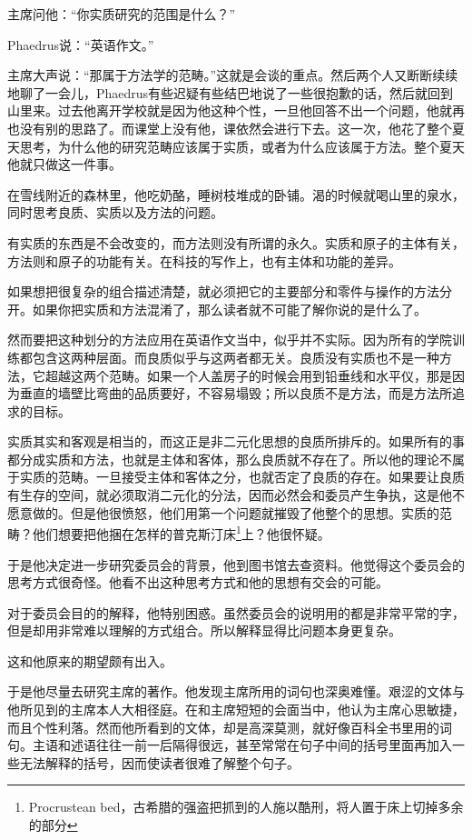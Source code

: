 \documentclass[UTF8]{article}
\begin{document}
\par 主席问他：“你实质研究的范围是什么？”
\par Phaedrus说：“英语作文。”
\par 主席大声说：“那属于方法学的范畴。”这就是会谈的重点。然后两个人又断断续续地聊了一会儿，Phaedrus有些迟疑有些结巴地说了一些很抱歉的话，然后就回到山里来。过去他离开学校就是因为他这种个性，一旦他回答不出一个问题，他就再也没有别的思路了。而课堂上没有他，课依然会进行下去。这一次，他花了整个夏天思考，为什么他的研究范畴应该属于实质，或者为什么应该属于方法。整个夏天他就只做这一件事。
\par 在雪线附近的森林里，他吃奶酪，睡树枝堆成的卧铺。渴的时候就喝山里的泉水，同时思考良质、实质以及方法的问题。
\par 有实质的东西是不会改变的，而方法则没有所谓的永久。实质和原子的主体有关，方法则和原子的功能有关。在科技的写作上，也有主体和功能的差异。
\par 如果想把很复杂的组合描述清楚，就必须把它的主要部分和零件与操作的方法分开。如果你把实质和方法混淆了，那么读者就不可能了解你说的是什么了。
\par 然而要把这种划分的方法应用在英语作文当中，似乎并不实际。因为所有的学院训练都包含这两种层面。而良质似乎与这两者都无关。良质没有实质也不是一种方法，它超越这两个范畴。如果一个人盖房子的时候会用到铅垂线和水平仪，那是因为垂直的墙壁比弯曲的品质要好，不容易塌毁；所以良质不是方法，而是方法所追求的目标。
\par 实质其实和客观是相当的，而这正是非二元化思想的良质所排斥的。如果所有的事都分成实质和方法，也就是主体和客体，那么良质就不存在了。所以他的理论不属于实质的范畴。一旦接受主体和客体之分，也就否定了良质的存在。如果要让良质有生存的空间，就必须取消二元化的分法，因而必然会和委员产生争执，这是他不愿意做的。但是他很愤怒，他们用第一个问题就摧毁了他整个的思想。实质的范畴？他们想要把他捆在怎样的普克斯汀床\footnote{Procrustean bed，古希腊的强盗把抓到的人施以酷刑，将人置于床上切掉多余的部分}上？他很怀疑。
\par 于是他决定进一步研究委员会的背景，他到图书馆去查资料。他觉得这个委员会的思考方式很奇怪。他看不出这种思考方式和他的思想有交会的可能。
\par 对于委员会目的的解释，他特别困惑。虽然委员会的说明用的都是非常平常的字，但是却用非常难以理解的方式组合。所以解释显得比问题本身更复杂。
\par 这和他原来的期望颇有出入。
\par 于是他尽量去研究主席的著作。他发现主席所用的词句也深奥难懂。艰涩的文体与他所见到的主席本人大相径庭。在和主席短短的会面当中，他认为主席心思敏捷，而且个性利落。然而他所看到的文体，却是高深莫测，就好像百科全书里用的词句。主语和述语往往一前一后隔得很远，甚至常常在句子中间的括号里面再加入一些无法解释的括号，因而使读者很难了解整个句子。
\end{document}
